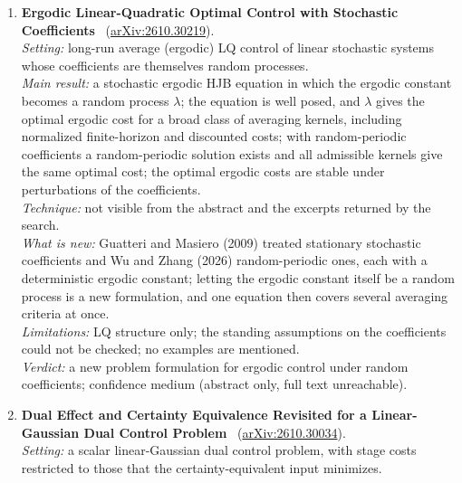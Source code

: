 \documentclass[11pt,a4paper]{article}
\begin{document}
\begin{enumerate}[leftmargin=*]
  \emph{Limitations:} constant coefficients only, so space- or time-dependent couplings are not covered; whether the observability constant is explicit could not be checked.\\
  \emph{Verdict:} a tight characterisation that closes the measurable-set case for constant-coefficient coupled systems; confidence medium (abstract only, full text unreachable).
  \item \textbf{Ergodic Linear-Quadratic Optimal Control with Stochastic Coefficients}~\cite{lin2026ergodic} (\href{https://arxiv.org/abs/2610.30219}{arXiv:2610.30219}).\\
  \emph{Setting:} long-run average (ergodic) \ac{LQ} control of linear stochastic systems whose coefficients are themselves random processes.\\
  \emph{Main result:} a stochastic ergodic \ac{HJB} equation in which the ergodic constant becomes a random process $\lambda$; the equation is well posed, and $\lambda$ gives the optimal ergodic cost for a broad class of averaging kernels, including normalized finite-horizon and discounted costs; with random-periodic coefficients a random-periodic solution exists and all admissible kernels give the same optimal cost; the optimal ergodic costs are stable under perturbations of the coefficients.\\
  \emph{Technique:} not visible from the abstract and the excerpts returned by the search.\\
  \emph{What is new:} Guatteri and Masiero (2009) treated stationary stochastic coefficients and Wu and Zhang (2026) random-periodic ones, each with a deterministic ergodic constant; letting the ergodic constant itself be a random process is a new formulation, and one equation then covers several averaging criteria at once.\\
  \emph{Limitations:} \ac{LQ} structure only; the standing assumptions on the coefficients could not be checked; no examples are mentioned.\\
  \emph{Verdict:} a new problem formulation for ergodic control under random coefficients; confidence medium (abstract only, full text unreachable).
  \item \textbf{Dual Effect and Certainty Equivalence Revisited for a Linear-Gaussian Dual Control Problem}~\cite{wang2026dual} (\href{https://arxiv.org/abs/2610.30034}{arXiv:2610.30034}).\\
  \emph{Setting:} a scalar linear-Gaussian dual control problem, with stage costs restricted to those that the certainty-equivalent input minimizes.\\

\end{enumerate}
\end{document}
